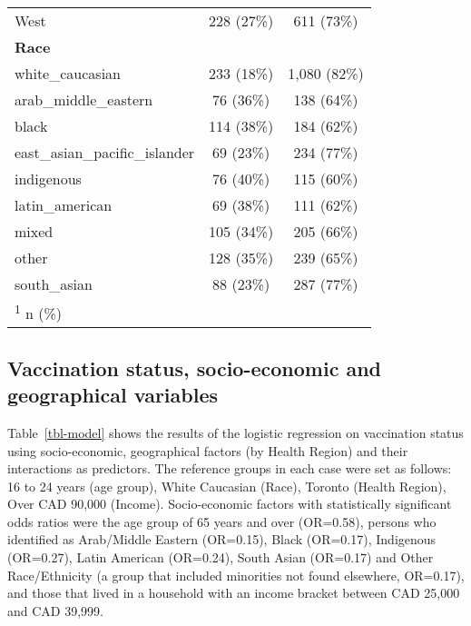 \documentclass[
  letterpaper,
  DIV=11,
  numbers=noendperiod]{scrartcl}
\begin{document}
\begin{table}
\begin{tabular}{lcc}
\hspace{1em}West & 228 (27\%) & 611 (73\%)\\
\textbf{Race} &  & \\
\addlinespace
\hspace{1em}white\_caucasian & 233 (18\%) & 1,080 (82\%)\\
\hspace{1em}arab\_middle\_eastern & 76 (36\%) & 138 (64\%)\\
\hspace{1em}black & 114 (38\%) & 184 (62\%)\\
\hspace{1em}east\_asian\_pacific\_islander & 69 (23\%) & 234 (77\%)\\
\hspace{1em}indigenous & 76 (40\%) & 115 (60\%)\\
\addlinespace
\hspace{1em}latin\_american & 69 (38\%) & 111 (62\%)\\
\hspace{1em}mixed & 105 (34\%) & 205 (66\%)\\
\hspace{1em}other & 128 (35\%) & 239 (65\%)\\
\hspace{1em}south\_asian & 88 (23\%) & 287 (77\%)\\
\bottomrule
\multicolumn{3}{l}{\rule{0pt}{1em}\textsuperscript{1} n (\%)}\\
\end{tabular}
\endgroup{}
\end{table}

\hypertarget{vaccination-status-socio-economic-and-geographical-variables}{%
\subsection{Vaccination status, socio-economic and geographical
variables}\label{vaccination-status-socio-economic-and-geographical-variables}}

Table~\ref{tbl-model} shows the results of the logistic regression on
vaccination status using socio-economic, geographical factors (by Health
Region) and their interactions as predictors. The reference groups in
each case were set as follows: 16 to 24 years (age group), White
Caucasian (Race), Toronto (Health Region), Over CAD 90,000 (Income).
Socio-economic factors with statistically significant odds ratios were
the age group of 65 years and over (OR=0.58), persons who identified as
Arab/Middle Eastern (OR=0.15), Black (OR=0.17), Indigenous (OR=0.27),
Latin American (OR=0.24), South Asian (OR=0.17) and Other Race/Ethnicity
(a group that included minorities not found elsewhere, OR=0.17), and
those that lived in a household with an income bracket between CAD
25,000 and CAD 39,999.
\end{document}
